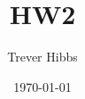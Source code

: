 \documentclass[12pt]{article}
\title{HW2}
\author{Trever Hibbs}
\date{\today}
\begin{document}
\maketitle

\section{}
\end{document}

